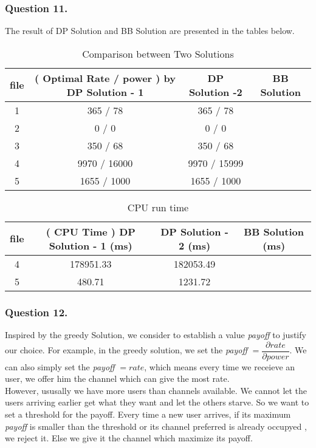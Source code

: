 \documentclass[11pt, oneside]{report}
\begin{document}
\subsubsection{Question 11. }

The result of DP Solution and BB Solution are presented in the tables below. 

\begin{table}[!htbp]
\centering
\begin{tabular}{|c|c|c|c|}%
\hline
file & ( Optimal Rate / power ) by DP Solution - 1 & DP Solution -2 &   BB Solution \\
\hline
1 & 365 / 78  & 365 / 78 & \\
\hline
2 & 0 / 0 & 0 / 0 & \\
\hline
3 & 350 / 68 & 350 / 68 & \\
\hline
4 & 9970 / 16000 & 9970 / 15999 & \\
\hline
5 & 1655 / 1000 & 1655 / 1000 & \\
\hline
\end{tabular}
\caption{Comparison between Two Solutions} 
\end{table}

\begin{table}[!htbp]
\centering
\begin{tabular}{|c|c|c|c|}%
\hline
file & ( CPU Time ) DP Solution - 1 (ms) & DP Solution - 2 (ms) & BB Solution (ms) \\
\hline
4 &  178951.33 & 182053.49 &\\
\hline
5 & 480.71 & 1231.72 &\\
\hline
\end{tabular}
\caption{CPU run time} 
\end{table}

\subsubsection{Question 12. }
Inspired by the greedy Solution, we consider to establish a value \textit{payoff} to justify our choice. For example, in the greedy solution, we set the \textit{payoff} $ = \dfrac{\partial rate}{\partial power}$. We can also simply set the \textit{payoff} $ = rate$, which means every time we receieve an user, we offer him the channel which can give the most rate. \\

However, ususally we have more users than channels available. We cannot let the users arriving earlier get what they want and let the others starve. So we want to set a threshold for the payoff. Every time a new user arrives, if its maximum \textit{payoff} is smaller than the threshold or its channel preferred is already occupyed , we reject it. Else we give it the channel which maximize its payoff. \\
\end{document}
